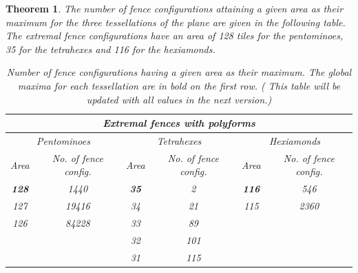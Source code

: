 \documentclass{amsart}
\newtheorem{theorem}{Theorem}
\theoremstyle{definition}
\theoremstyle{remark}
\begin{document}
	\begin{theorem}\label{thm:tab:number_of_solutions}
		The number of fence configurations attaining a given area as their maximum for the three tessellations of the plane are given in the following table. The extremal fence configurations have an area of 128 tiles for the pentominoes, 35 for the tetrahexes and 116 for the hexiamonds.
		\begin{table}[H]
			\begingroup
			\centering
			\begin{tabular}{c|c||c|c||c|c}
				\multicolumn{6}{c}{Extremal fences with polyforms} \\\hline
				\multicolumn{2}{c}{Pentominoes}& \multicolumn{2}{c}{Tetrahexes} & \multicolumn{2}{c}{Hexiamonds}\\\hline
				Area & No. of fence config.  &  Area & No. of fence config. &  Area & No. of fence config. \\\hline\hline
				\textbf{128} & 1440 & \textbf{35} & 2 & \textbf{116} & 546 \\\hline
				127 & 19416 & 34 & 21 & 115 & 2360\\
				126 & 84228 & 33& 89 & & \\
				&& 32 & 101 & & \\
				& & 31 & 115 &&
			\end{tabular}
			\caption{Number of fence configurations having a given area as their maximum. The global maxima for each tessellation are in bold on the first row. ( This table will be updated with all values in the next version.)}
			\endgroup
		\end{table}
	\end{theorem}
	
	
			
	
	
\end{document}
